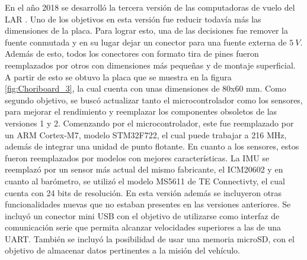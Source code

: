 %     

%     



En el año 2018 se desarrolló la tercera versión de las computadoras de vuelo del LAR \cite{garberoglio2019diseno}. Uno de los objetivos en esta versión fue reducir todavía más las dimensiones de la placa. Para lograr esto, una de las decisiones fue remover la fuente conmutada y en su lugar dejar un conector para una fuente externa de $5 \ V$. Además de esto, todos los conectores con formato tira de pines fueron reemplazados por otros con dimensiones más pequeñas y de montaje superficial. A partir de esto se obtuvo la placa que se muestra en la figura \ref{fig:Choriboard_3}, la cual cuenta con unas dimensiones de 80x60 mm. Como segundo objetivo, se buscó actualizar tanto el microcontrolador como los sensores, para mejorar el rendimiento y reemplazar los componentes obsoletos de las versiones 1 y 2. Comenzando por el microcontrolador, este fue reemplazado por un ARM Cortex-M7, modelo STM32F722, el cual puede trabajar a 216 MHz, además de integrar una unidad de punto flotante. En cuanto a los sensores, estos fueron reemplazados por modelos con mejores características. La IMU se reemplazó por un sensor más actual del mismo fabricante, el ICM20602 y en cuanto al barómetro, se utilizó el modelo MS5611 de TE Connectivty, el cual cuenta con 24 bits de resolución. En esta versión además se incluyeron otras funcionalidades nuevas que no estaban presentes en las versiones anteriores. Se incluyó un conector mini USB con el objetivo de utilizarse como interfaz de comunicación serie que permita alcanzar velocidades superiores a las de una UART. También se incluyó la posibilidad de usar una memoria microSD, con el objetivo de almacenar datos pertinentes a la misión del vehículo.


